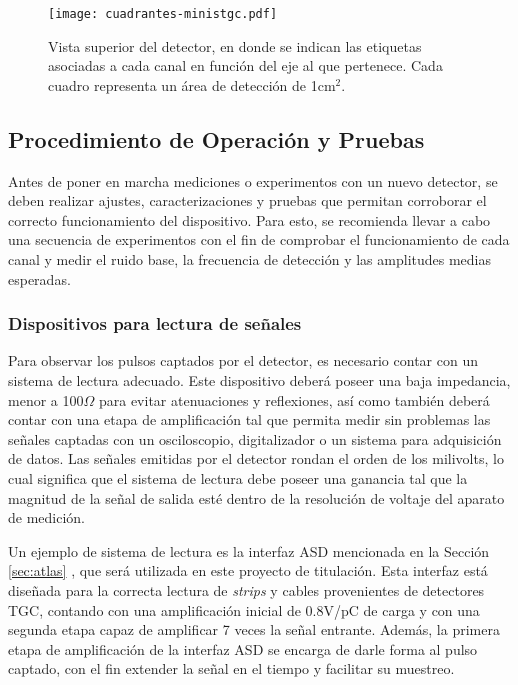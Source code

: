 	\begin{figure}[h]
		\centering
		\texttt{[image: cuadrantes-ministgc.pdf]}
		\caption{Vista superior del detector, en donde se indican las etiquetas asociadas a cada canal en función del eje al que pertenece. Cada cuadro representa un área de detección de 1cm$^2$.}
		\label{img:cuadrantes-ministgc}
	\end{figure}

\subsection{Procedimiento de Operación y Pruebas}
	Antes de poner en marcha mediciones o experimentos con un nuevo detector, se deben realizar ajustes, caracterizaciones y pruebas que permitan corroborar el correcto funcionamiento del dispositivo. Para esto, se recomienda llevar a cabo una secuencia de experimentos con el fin de comprobar el funcionamiento de cada canal y medir el ruido base, la frecuencia de detección y las amplitudes medias esperadas.

	\subsubsection{Dispositivos para lectura de señales}
		Para observar los pulsos captados por el detector, es necesario contar con un sistema de lectura adecuado. Este dispositivo deberá poseer una  baja impedancia, menor a 100$\Omega$ para evitar atenuaciones y reflexiones, así como también deberá contar con una etapa de amplificación tal que permita medir sin problemas las señales captadas con un osciloscopio, digitalizador o un sistema para adquisición de datos. Las señales emitidas por el detector rondan el orden de los milivolts, lo cual significa que el sistema de lectura debe poseer una ganancia tal que la magnitud de la señal de salida esté dentro de la resolución de voltaje del aparato de medición.
		
		Un ejemplo de sistema de lectura es la interfaz ASD mencionada en la Sección \ref{sec:atlas} , que será utilizada en este proyecto de titulación. Esta interfaz está diseñada para la correcta lectura de \textit{strips} y cables provenientes de detectores TGC,  contando con una amplificación inicial de 0.8V/pC de carga y con una segunda etapa capaz de amplificar 7 veces la señal entrante. Además, la primera etapa de amplificación de la interfaz ASD se encarga de darle forma al pulso captado, con el fin extender la señal en el tiempo y facilitar su muestreo.
		
